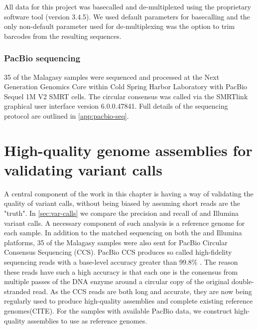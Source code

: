 
All \ont{} data for this project was basecalled and de-multiplexed using the \ont{} proprietary software tool \guppy{} (version 3.4.5). We used default parameters for basecalling and the only non-default parameter used for de-multiplexing was the option to trim barcodes from the resulting sequences.  

\subsubsection{PacBio sequencing}
35 of the Malagasy samples were sequenced and processed at the Next Generation Genomics Core within Cold Spring Harbor Laboratory with PacBio Sequel 1M V2 SMRT cells. The circular consensus was called via the SMRTlink graphical user interface version 6.0.0.47841. Full details of the sequencing protocol are outlined in \autoref{app:pacbio-seq}.


\section{High-quality genome assemblies for validating variant calls}
\label{sec:asm_results}
A central component of the work in this chapter is having a way of validating the quality of variant calls, without being biased by assuming short reads are the "truth". In \autoref{sec:var-calls} we compare the precision and recall of \ont{} and Illumina variant calls. A necessary component of such analysis is a reference genome for each sample. In addition to the matched sequencing on both the \ont{} and Illumina platforms, 35 of the Malagasy samples were also sent for PacBio Circular Consensus Sequencing (CCS). PacBio CCS produces so called high-fidelity sequencing reads with a base-level accuracy greater than 99.8\% \cite{wenger2019}. The reason these reads have such a high accuracy is that each one is the consensus from multiple passes of the DNA enzyme around a circular copy of the original double-stranded read. As the CCS reads are both long and accurate, they are now being regularly used to produce high-quality \denovo{} assemblies and complete existing reference genomes(CITE). 
For the samples with available PacBio data, we construct high-quality assemblies to use as reference genomes.

